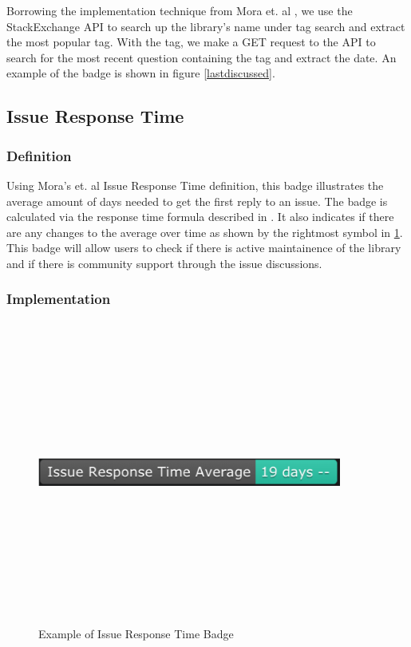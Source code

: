 \documentclass[12pt, letterpaper]{article}
\begin{document}
Borrowing the implementation technique from Mora et. al \cite{metrics}, we use the StackExchange API \cite{stackexchangeapi}
to search up the library's name under tag search and extract the most popular tag.
With the tag, we make a GET request to the API to search for the most recent question containing the tag
and extract the date. An example of the badge is shown in figure \ref{lastdiscussed}.

\subsection{Issue Response Time}
\subsubsection{Definition}
Using Mora's et. al \cite{metrics} Issue Response Time definition, this badge illustrates the average
amount of days needed to get the first reply to an issue. The badge is calculated via the response time
formula described in \cite{metrics}. It also indicates if there are any changes to the average over time 
as shown by the rightmost symbol in \ref{issueresponse}. 
This badge will allow users to check if there is active maintainence of the library and if there is community support
through the issue discussions. 

\subsubsection{Implementation}

\begin{figure}[!htb]
    \centerline{
        \includegraphics[width=10cm,height=10cm,keepaspectratio=true]{issueresponsebadge}
    }
    \caption{
        Example of Issue Response Time Badge
    }
    \label{issueresponse}
\end{figure}
\end{document}

